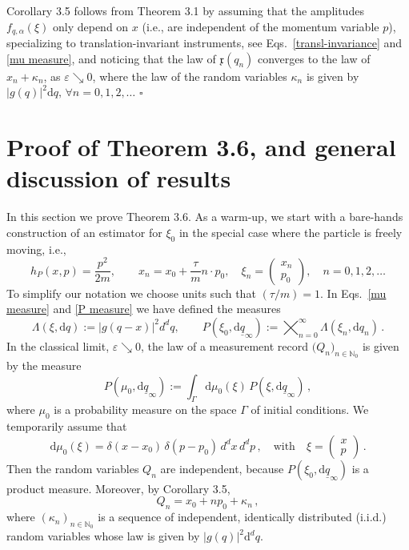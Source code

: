 \documentclass[12pt]{article}
\begin{document}
\medskip
Corollary 3.5 follows from Theorem 3.1 by assuming that the amplitudes $f_{q, \alpha}(\xi)$ only depend on $x$ 
(i.e., are independent of the momentum variable $p$), specializing to translation-invariant instruments, see 
Eqs.~\eqref{transl-invariance} and \eqref{mu measure}, and noticing that the law of $\mathfrak{x}(q_n)$ converges to the law of $x_n + \kappa_n$, 
as $\varepsilon \searrow 0$, where the law of the random variables $\kappa_n$ is given by 
$\vert g(q)\vert^{2} \text{d}q, \,\forall n=0,1,2, \dots$ \hfill$\square$



\section{Proof of Theorem 3.6, and general discussion of results}\label{sec:estim}
In this section we prove Theorem 3.6. As a warm-up, we start with a bare-hands construction of an estimator for $\xi_0$ in the special case
where the particle is freely moving, i.e.,
\begin{equation}\label{free particle}
h_P(x,p)= \frac{p^2}{2m}, \qquad x_n= x_0 + \frac{\tau}{m} n\cdot p_0, \quad \xi_{n} = 
\begin{pmatrix} x_n\\p_0 \end{pmatrix}, \quad n=0,1,2,\dots
\end{equation}
To simplify our notation we choose units such that $(\tau/m)=1$. In Eqs.~\eqref{mu measure} and \eqref{P measure} we have defined the measures 
$$\Lambda(\xi, \text{d}q):= \big| g(q-x) \big|^{2} d^{d}q, 
\qquad P(\xi_0, \text{d}\underline{q}_{\infty}):= \bigtimes_{n=0}^{\infty} \Lambda(\xi_n, \text{d}q_n)\,.$$
In the classical limit, $\varepsilon \searrow 0$, the law of a measurement record 
$\big(Q_n\big)_{n\in \mathbb{N}_0}$ is given by the measure 
\begin{equation}\label{Gibbs measure}
P(\mu_0, \text{d}\underline{q}_{\infty}):= \int_{\Gamma} \text{d}\mu_{0}(\xi)\, P(\xi, \text{d}\underline{q}_{\infty})\,,
\end{equation}
where $\mu_0$ is a probability measure on the space $\Gamma$ of initial conditions.
We temporarily assume that 
$$\text{d}\mu_{0}(\xi)= \delta(x- x_0) \, \delta(p - p_0)\,d^{d}x \, d^{d}p\,, \quad \text{with} \quad \xi=
\begin{pmatrix} x\\p \end{pmatrix}\,.$$
Then the random variables $Q_n$ are independent, because $P(\xi_0, \text{d}\underline{q}_{\infty})$ is a product measure. Moreover, by Corollary 3.5,
$$Q_n=x_0+np_0+\kappa_n\,,$$
where $(\kappa_n)_{n\in \mathbb N_0}$ is a sequence of independent, identically distributed (i.i.d.) random variables 
whose law is given by $|g(q)|^2\text{d}^dq$.
 
\end{document}
